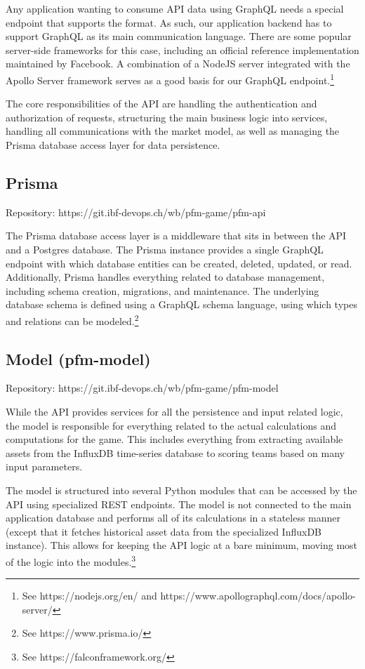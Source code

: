 Any application wanting to consume API data using GraphQL needs a special endpoint that supports the format. As such, our application backend has to support GraphQL as its main communication language. There are some popular server-side frameworks for this case, including an official reference implementation maintained by Facebook. A combination of a NodeJS server integrated with the Apollo Server framework serves as a good basis for our GraphQL endpoint.\footnote{See https://nodejs.org/en/ and https://www.apollographql.com/docs/apollo-server/}

The core responsibilities of the API are handling the authentication and authorization of requests, structuring the main business logic into services, handling all communications with the market model, as well as managing the Prisma database access layer for data persistence.


\subsection{Prisma}

Repository: https://git.ibf-devops.ch/wb/pfm-game/pfm-api

The Prisma database access layer is a middleware that sits in between the API and a Postgres database. The Prisma instance provides a single GraphQL endpoint with which database entities can be created, deleted, updated, or read. Additionally, Prisma handles everything related to database management, including schema creation, migrations, and maintenance. The underlying database schema is defined using a GraphQL schema language, using which types and relations can be modeled.\footnote{See https://www.prisma.io/}


\subsection{Model (pfm-model)}

Repository: https://git.ibf-devops.ch/wb/pfm-game/pfm-model

While the API provides services for all the persistence and input related logic, the model is responsible for everything related to the actual calculations and computations for the game. This includes everything from extracting available assets from the InfluxDB time-series database to scoring teams based on many input parameters.

The model is structured into several Python modules that can be accessed by the API using specialized REST endpoints. The model is not connected to the main application database and performs all of its calculations in a stateless manner (except that it fetches historical asset data from the specialized InfluxDB instance). This allows for keeping the API logic at a bare minimum, moving most of the logic into the modules.\footnote{See https://falconframework.org/}


